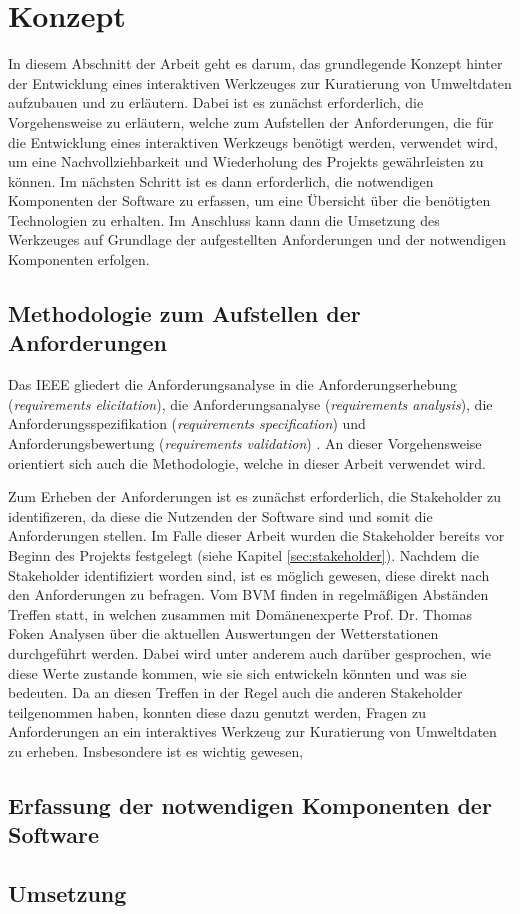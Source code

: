 \chapter{Konzept} %
In diesem Abschnitt der Arbeit geht es darum, das grundlegende Konzept hinter der Entwicklung eines interaktiven Werkzeuges zur Kuratierung von Umweltdaten aufzubauen und zu erläutern. Dabei ist es zunächst erforderlich, 
die Vorgehensweise zu erläutern, welche zum Aufstellen der Anforderungen, die für die Entwicklung eines interaktiven Werkzeugs benötigt werden, verwendet wird, um eine Nachvollziehbarkeit und Wiederholung des Projekts gewährleisten zu 
können. \newline Im nächsten Schritt ist es dann erforderlich, die notwendigen Komponenten der Software zu erfassen, um eine Übersicht über die benötigten Technologien zu erhalten. Im Anschluss kann dann die Umsetzung des Werkzeuges auf Grundlage 
der aufgestellten Anforderungen und der notwendigen Komponenten erfolgen.

\section{Methodologie zum Aufstellen der Anforderungen}
Das \ac{IEEE} gliedert die Anforderungsanalyse in die Anforderungserhebung (\textit{requirements elicitation}), die Anforderungsanalyse (\textit{requirements analysis}), die Anforderungsspezifikation (\textit{requirements specification}) und Anforderungsbewertung 
(\textit{requirements validation}) \cite{ieee2004}. An dieser Vorgehensweise orientiert sich auch die Methodologie, welche in dieser Arbeit verwendet wird.

Zum Erheben der Anforderungen ist es zunächst erforderlich, die Stakeholder zu identifizeren, da diese 
die Nutzenden der Software sind und somit die Anforderungen stellen. Im Falle dieser Arbeit wurden die Stakeholder bereits vor Beginn des Projekts festgelegt (siehe Kapitel \ref{sec:stakeholder}). Nachdem die Stakeholder identifiziert worden sind, ist es möglich gewesen, 
diese direkt nach den Anforderungen zu befragen. Vom \ac{BVM} finden in regelmäßigen Abständen Treffen statt, in welchen zusammen mit Domänenexperte Prof. Dr. Thomas Foken Analysen über die aktuellen Auswertungen der Wetterstationen durchgeführt werden. Dabei wird unter anderem 
auch darüber gesprochen, wie diese Werte zustande kommen, wie sie sich entwickeln könnten und was sie bedeuten. Da an diesen Treffen in der Regel auch die anderen Stakeholder teilgenommen haben, konnten diese dazu genutzt werden, Fragen zu Anforderungen an ein interaktives Werkzeug 
zur Kuratierung von Umweltdaten zu erheben. Insbesondere ist es wichtig gewesen, 

\section{Erfassung der notwendigen Komponenten der Software}

\section{Umsetzung}
